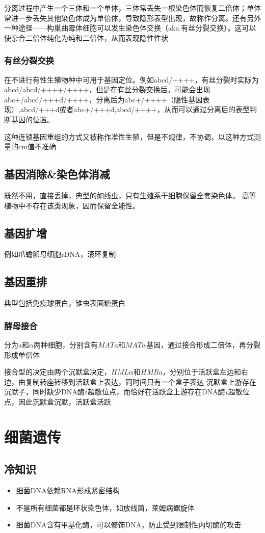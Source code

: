 \documentclass[a4paper, 12pt]{report}
\begin{document}
分离过程中产生一个三体和一个单体，三体常丢失一根染色体而恢复二倍体；单体常进一步丢失其他染色体成为单倍体，导致隐形表型出现，故称作分离。还有另外一种途径——构巢曲霉体细胞可以发生染色体交换（aka.有丝分裂交换）。这可以使杂合二倍体纯化为纯和二倍体，从而表现隐性性状
\subsection{有丝分裂交换}
在不进行有性生殖物种中可用于基因定位。例如abcd/++++，有丝分裂时实际为abcd/abcd/++++/++++，但是在有丝分裂交换后，可能会出现abc+/abcd/+++d/++++，分离后为abc+/++++（隐性基因表现）,abcd/+++d或者abc+/+++d,abcd/++++，从而可以通过分离后的表型判断基因的位置。

这种连锁基因重组的方式又被称作准性生殖，但是不规律，不协调，以这种方式测量的cm值不准确
\section{基因消除\&染色体消减}
既然不用，直接丢掉，典型的如线虫，只有生殖系干细胞保留全套染色体。
高等植物中不存在该类现象，因而保留全能性。
\section{基因扩增}
例如爪蟾卵母细胞rDNA，滚环复制
\section{基因重排}
典型包括免疫球蛋白，锥虫表面糖蛋白
\subsection{酵母接合}
分为a和\(\alpha\)两种细胞，分别含有\(MATa\)和\(MAT\alpha\)基因，通过接合形成二倍体，再分裂形成单倍体

接合型的决定由两个沉默盒决定，\(HML\alpha\)和\(HMRa\)，分别位于活跃盒左边和右边，由复制转座转移到活跃盒上表达，同时间只有一个盒子表达
沉默盒上游存在沉默子，同时缺少DNA酶\(\romannumeral1\)超敏位点，而恰好在活跃盒上游存在DNA酶\(\romannumeral1\)超敏位点，因此沉默盒沉默，活跃盒活跃
\chapter{细菌遗传}
\section{冷知识}
\begin{itemize}
    \item 细菌DNA依赖RNA形成紧密结构
    \item 不是所有细菌都是环状染色体，如放线菌，莱姆病螺旋体
    \item 细菌DNA含有甲基化酶，可以修饰DNA，防止受到限制性内切酶的攻击
\end{itemize}
\end{document}

